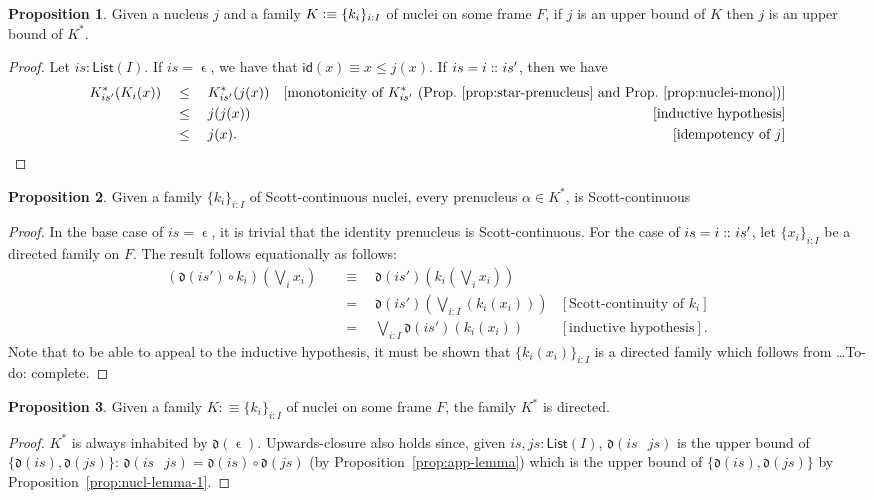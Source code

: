\documentclass[a4paper, 11pt]{article}
\theoremstyle{definition}
\newtheorem{prop}{Proposition}
\newcommand{\is}{\vcentcolon\equiv}
\DeclareMathOperator{\emptyl}{\epsilon}
\DeclareMathOperator{\cons}{\colon\kern-1.1ex\colon\kern-0.4ex}
\DeclareMathOperator{\append}{\,}
\newcommand{\dd}[1]{\mathfrak{d}(#1)}
\newcommand{\todo}[1]{{\large\color{orange}\textsf{To-do: #1.}}}
\begin{document}
\begin{prop}\label{prop:star-ub}
  Given a nucleus $j$ and a family $K \is \{ k_i \}_{i : I}$ of nuclei on some frame $F$, if $j$ is
  an upper bound of $K$ then $j$ is an upper bound of $K^*$.
\end{prop}
\begin{proof}
  Let $is : \mathsf{List}(I)$. If $is = \emptyl$, we have that $\mathsf{id}(x) \equiv x \le j(x)$.
  If $is = i \cons is'$, then we have
  \begin{align*}
       K^*_{is'}(K_i(x))
  \quad&\le\quad K^*_{is'}(j(x)) & [\text{monotonicity of $K^*_{is'}$ (Prop.~\ref{prop:star-prenucleus} and Prop.~\ref{prop:nuclei-mono})}] \\
  \quad&\le\quad j(j(x))        & [\text{inductive hypothesis}] \\
  \quad&\le\quad j(x).          & [\text{idempotency of $j$}]
  \end{align*}
\end{proof}

\begin{prop}
  Given a family $\{ k_i \}_{i : I}$ of Scott-continuous nuclei, every
  prenucleus $\alpha \in K^*$, is Scott-continuous
\end{prop}
\begin{proof}
  In the base case of $is = \emptyl$, it is trivial that the identity
  prenucleus is Scott-continuous. For the case of $is = i \cons is'$, let
  $\{ x_i \}_{i : I}$ be a directed family on $F$. The result follows equationally
  as follows:
  \begin{align*}
    (\dd{is'} \circ k_i) \left(\bigvee_i x_i\right)
    &\quad\equiv\quad \dd{is'}\left(k_i \left( \bigvee_i x_i \right)\right) & \\
    &\quad=\quad \dd{is'}\left(\bigvee_{i : I} \left( k_i(x_i) \right)\right) & [\text{Scott-continuity of $k_i$}]\\
    &\quad=\quad \bigvee_{i : I} \dd{is'}(k_i(x_i)) & [\text{inductive hypothesis}].
  \end{align*}
  Note that to be able to appeal to the inductive hypothesis, it must be shown that
  $\{ k_i(x_i) \}_{i : I}$ is a directed family which follows from \ldots \todo{complete}
\end{proof}

\begin{prop}
  Given a family $K :\equiv \{ k_i \}_{i : I}$ of nuclei on some frame $F$, the family $K^*$ is directed.
\end{prop}
\begin{proof}
  $K^*$ is always inhabited by $\dd{\emptyl}$. Upwards-closure also holds since,
  given $is, js : \mathsf{List}(I)$, $\dd{is \append js}$ is the upper bound of $\{ \dd{is}, \dd{js}
  \}$: $\dd{is \append js} = \dd{is} \circ \dd{js}$ (by Proposition~\ref{prop:app-lemma}) which is the
  upper bound of $\{ \dd{is}, \dd{js} \}$ by Proposition~\ref{prop:nucl-lemma-1}.
\end{proof}
\end{document}
